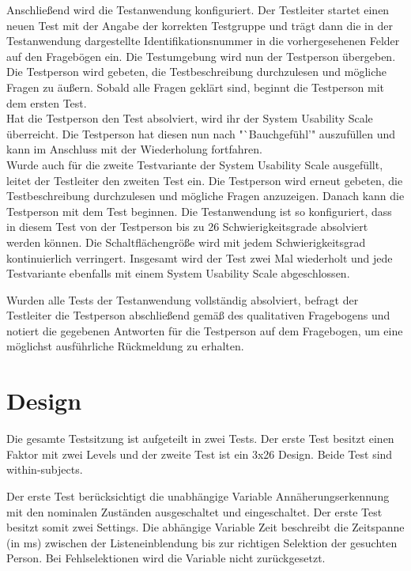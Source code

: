 \documentclass[12pt,bibliography=totocnumbered,listof=totocnumbered,abstracton]{scrreprt}
\begin{document}
Anschließend wird die Testanwendung konfiguriert. Der Testleiter startet einen neuen Test mit der Angabe der korrekten Testgruppe und trägt dann die in der Testanwendung dargestellte Identifikationsnummer in die vorhergesehenen Felder auf den Fragebögen ein. Die Testumgebung wird nun der Testperson übergeben. Die Testperson wird gebeten, die Testbeschreibung durchzulesen und mögliche Fragen zu äußern. Sobald alle Fragen geklärt sind, beginnt die Testperson mit dem ersten Test.\\
Hat die Testperson den Test absolviert, wird ihr der System Usability Scale überreicht. Die Testperson hat diesen nun nach "`Bauchgefühl'" auszufüllen und kann im Anschluss mit der Wiederholung fortfahren.\\
Wurde auch für die zweite Testvariante der System Usability Scale ausgefüllt, leitet der Testleiter den zweiten Test ein. Die Testperson wird erneut gebeten, die Testbeschreibung durchzulesen und mögliche Fragen anzuzeigen. Danach kann die Testperson mit dem Test beginnen. Die Testanwendung ist so konfiguriert, dass in diesem Test von der Testperson bis zu 26 Schwierigkeitsgrade absolviert werden können. Die Schaltflächengröße wird mit jedem Schwierigkeitsgrad kontinuierlich verringert. Insgesamt wird der Test zwei Mal wiederholt und jede Testvariante ebenfalls mit einem System Usability Scale abgeschlossen.

Wurden alle Tests der Testanwendung vollständig absolviert, befragt der Testleiter die Testperson abschließend gemäß des qualitativen Fragebogens und notiert die gegebenen Antworten für die Testperson auf dem Fragebogen, um eine möglichst ausführliche Rückmeldung zu erhalten. 

\section{Design}\label{sec:design}
Die gesamte Testsitzung ist aufgeteilt in zwei Tests. Der erste Test besitzt einen Faktor mit zwei Levels und der zweite Test ist ein 3x26 Design. Beide Test sind within-subjects.

Der erste Test berücksichtigt die unabhängige Variable {\ttfamily Annäherungserkennung} mit den nominalen Zuständen {\ttfamily ausgeschaltet} und {\ttfamily eingeschaltet}. Der erste Test besitzt somit zwei Settings. Die abhängige Variable {\ttfamily Zeit} beschreibt die Zeitspanne (in ms) zwischen der Listeneinblendung bis zur richtigen Selektion der gesuchten Person. Bei Fehlselektionen wird die Variable nicht zurückgesetzt.
\end{document}
